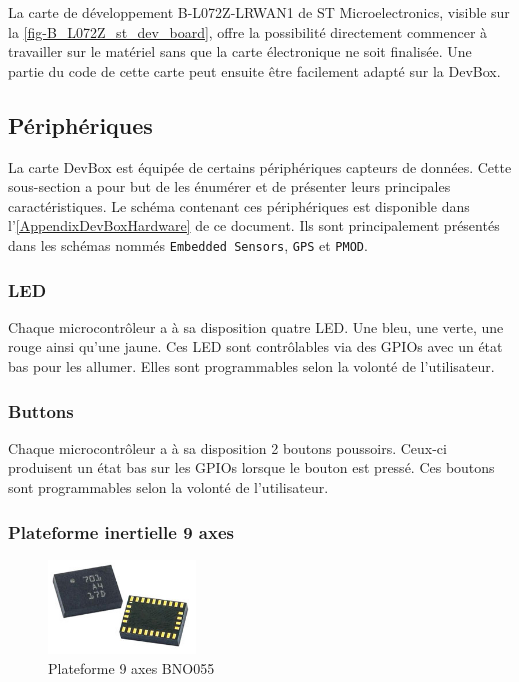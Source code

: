 La carte de développement B-L072Z-LRWAN1 de ST Microelectronics, visible sur la \cref{fig-B_L072Z_st_dev_board}, offre la possibilité directement commencer à travailler sur le matériel sans que la carte électronique ne soit finalisée. Une partie du code de cette carte peut ensuite être facilement adapté sur la DevBox.



\subsection{Périphériques}

La carte DevBox est équipée de certains périphériques capteurs de données. Cette sous-section a pour but de les énumérer et de présenter leurs principales caractéristiques. Le schéma contenant ces périphériques est disponible dans l'\cref{AppendixDevBoxHardware} de ce document. Ils sont principalement présentés dans les schémas nommés \texttt{Embedded Sensors}, \texttt{GPS} et \texttt{PMOD}.

\subsubsection{LED}

Chaque microcontrôleur a à sa disposition quatre LED. Une bleu, une verte, une rouge ainsi qu'une jaune. Ces LED sont contrôlables via des GPIOs avec un état bas pour les allumer. Elles sont programmables selon la volonté de l'utilisateur.

\subsubsection{Buttons}

Chaque microcontrôleur a à sa disposition 2 boutons poussoirs. Ceux-ci produisent un état bas sur les GPIOs lorsque le bouton est pressé. Ces boutons sont programmables selon la volonté de l'utilisateur.

\subsubsection{Plateforme inertielle 9 axes}

\begin{figure}[ht!]
    \centering
    \includegraphics[width=0.35\textwidth]{Figures/Hardware/bno055_model.png}
    \caption{Plateforme 9 axes BNO055}
    \label{fig-bno055_model}
\end{figure}

